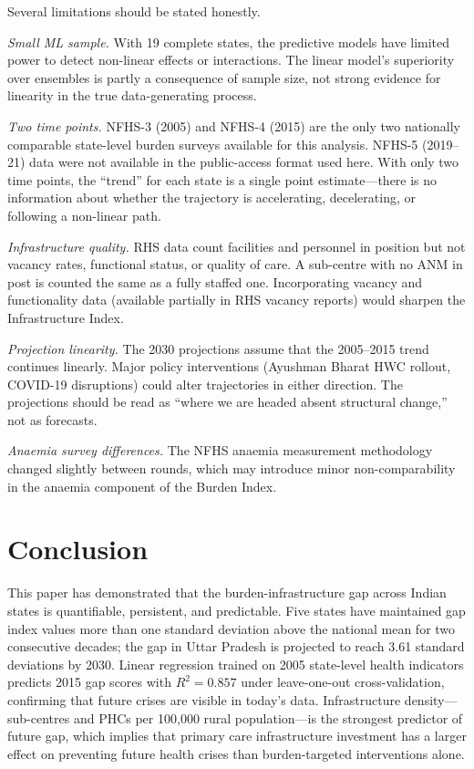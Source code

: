 \documentclass[conference]{IEEEtran}
\begin{document}
Several limitations should be stated honestly.

\textit{Small ML sample.} With 19 complete states, the predictive
models have limited power to detect non-linear effects or interactions.
The linear model's superiority over ensembles is partly a consequence
of sample size, not strong evidence for linearity in the true
data-generating process.

\textit{Two time points.} NFHS-3 (2005) and NFHS-4 (2015) are the
only two nationally comparable state-level burden surveys available
for this analysis. NFHS-5 (2019--21) data were not available in the
public-access format used here. With only two time points, the
``trend'' for each state is a single point estimate---there is no
information about whether the trajectory is accelerating, decelerating,
or following a non-linear path.

\textit{Infrastructure quality.} RHS data count facilities and
personnel in position but not vacancy rates, functional status, or
quality of care. A sub-centre with no ANM in post is counted the same
as a fully staffed one. Incorporating vacancy and functionality data
(available partially in RHS vacancy reports) would sharpen the
Infrastructure Index.

\textit{Projection linearity.} The 2030 projections assume that
the 2005--2015 trend continues linearly. Major policy interventions
(Ayushman Bharat HWC rollout, COVID-19 disruptions) could alter
trajectories in either direction. The projections should be read as
``where we are headed absent structural change,'' not as forecasts.

\textit{Anaemia survey differences.} The NFHS anaemia measurement
methodology changed slightly between rounds, which may introduce
minor non-comparability in the anaemia component of the Burden Index.

\section{Conclusion}

This paper has demonstrated that the burden-infrastructure gap across
Indian states is quantifiable, persistent, and predictable. Five states
have maintained gap index values more than one standard deviation above
the national mean for two consecutive decades; the gap in Uttar Pradesh
is projected to reach 3.61 standard deviations by 2030. Linear
regression trained on 2005 state-level health indicators predicts 2015
gap scores with $R^2 = 0.857$ under leave-one-out cross-validation,
confirming that future crises are visible in today's data. Infrastructure
density---sub-centres and PHCs per 100,000 rural population---is the
strongest predictor of future gap, which implies that primary care
infrastructure investment has a larger effect on preventing future
health crises than burden-targeted interventions alone.
\end{document}

